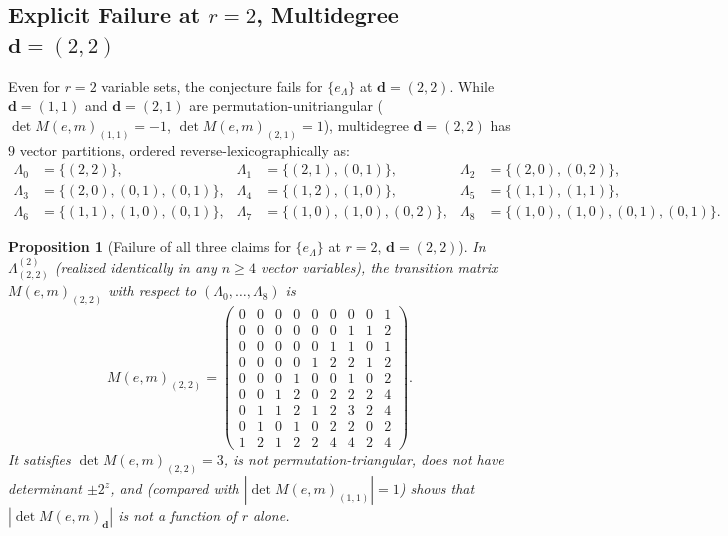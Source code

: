 \documentclass[11pt,a4paper]{article}
\newtheorem{proposition}[theorem]{Proposition}
\theoremstyle{definition}
\theoremstyle{remark}
\newcommand{\vecd}{\mathbf{d}}
\begin{document}
\subsection{Explicit Failure at \texorpdfstring{$r = 2$}{r = 2}, Multidegree \texorpdfstring{$\vecd = (2,2)$}{d = (2,2)}}

Even for $r = 2$ variable sets, the conjecture fails for $\{e_\Lambda\}$ at $\vecd = (2,2)$. While $\vecd = (1,1)$ and $\vecd = (2,1)$ are permutation-unitriangular ($\det M(e,m)_{(1,1)} = -1$, $\det M(e,m)_{(2,1)} = 1$), multidegree $\vecd = (2,2)$ has $9$ vector partitions, ordered reverse-lexicographically as:
\begin{align*}
  \Lambda_0 &= \{(2,2)\}, &
  \Lambda_1 &= \{(2,1),(0,1)\}, &
  \Lambda_2 &= \{(2,0),(0,2)\}, \\
  \Lambda_3 &= \{(2,0),(0,1),(0,1)\}, &
  \Lambda_4 &= \{(1,2),(1,0)\}, &
  \Lambda_5 &= \{(1,1),(1,1)\}, \\
  \Lambda_6 &= \{(1,1),(1,0),(0,1)\}, &
  \Lambda_7 &= \{(1,0),(1,0),(0,2)\}, &
  \Lambda_8 &= \{(1,0),(1,0),(0,1),(0,1)\}.
\end{align*}

\begin{proposition}[Failure of all three claims for $\{e_\Lambda\}$ at $r = 2$, $\vecd = (2,2)$]\label{prop:e22}
In $\Lambda^{(2)}_{(2,2)}$ (realized identically in any $n \ge 4$ vector variables), the transition matrix $M(e,m)_{(2,2)}$ with respect to $(\Lambda_0, \dots, \Lambda_8)$ is
\[
  M(e,m)_{(2,2)} =
  \begin{pmatrix}
    0 & 0 & 0 & 0 & 0 & 0 & 0 & 0 & 1 \\
    0 & 0 & 0 & 0 & 0 & 0 & 1 & 1 & 2 \\
    0 & 0 & 0 & 0 & 0 & 1 & 1 & 0 & 1 \\
    0 & 0 & 0 & 0 & 1 & 2 & 2 & 1 & 2 \\
    0 & 0 & 0 & 1 & 0 & 0 & 1 & 0 & 2 \\
    0 & 0 & 1 & 2 & 0 & 2 & 2 & 2 & 4 \\
    0 & 1 & 1 & 2 & 1 & 2 & 3 & 2 & 4 \\
    0 & 1 & 0 & 1 & 0 & 2 & 2 & 0 & 2 \\
    1 & 2 & 1 & 2 & 2 & 4 & 4 & 2 & 4
  \end{pmatrix}.
\]
It satisfies $\det M(e,m)_{(2,2)} = 3$, is not permutation-triangular, does not have determinant $\pm 2^z$, and (compared with $|\det M(e,m)_{(1,1)}| = 1$) shows that $|\det M(e,m)_{\vecd}|$ is not a function of $r$ alone.
\end{proposition}
\end{document}
